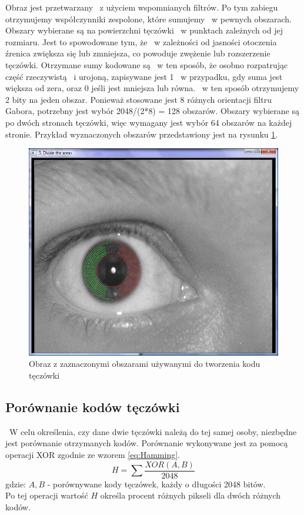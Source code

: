 Obraz jest przetwarzany ~z użyciem wspomnianych filtrów. Po tym zabiegu otrzymujemy współczynniki zespolone, które sumujemy ~w pewnych obszarach. Obszary wybierane są na powierzchni tęczówki ~w punktach zależnych od jej rozmiaru. Jest to spowodowane tym, że ~w zależności od jasności otoczenia źrenica zwiększa się lub zmniejsza, co powoduje zwężenie lub rozszerzenie tęczówki. Otrzymane sumy kodowane są ~w ten sposób, że osobno rozpatrując część rzeczywistą ~i urojoną, zapisywane jest 1 ~w przypadku, gdy suma jest większa od zera, oraz 0 jeśli jest mniejsza lub równa. ~w ten sposób otrzymujemy 2 bity na jeden obszar. Ponieważ stosowane jest 8 różnych orientacji filtru Gabora, potrzebny jest wybór 2048/(2*8) = 128 obszarów. Obszary wybierane są po dwóch stronach tęczówki, więc wymagany jest wybór 64 obszarów na każdej stronie. Przykład wyznaczonych obszarów przedstawiony jest na rysunku \ref{fig:obszaryNasze}.

\begin{figure}
\label{fig:obszaryNasze}
\begin{center}
\includegraphics[scale=0.5]{obszary.jpg}
\caption{Obraz z zaznaczonymi obszarami używanymi do tworzenia kodu tęczówki}
\end{center}
\end{figure}

\subsection{Porównanie kodów tęczówki}
\label{subsec:porownanieKodow}
~W celu określenia, czy dane dwie tęczówki należą do tej samej osoby, niezbędne jest porównanie otrzymanych kodów. Porównanie wykonywane jest za pomocą operacji XOR zgodnie ze wzorem \ref{eq:Hamming}.
\begin{equation}
\label{eq:Hamming}
H = \sum \frac{XOR(A,B)}{2048}
\end{equation}
gdzie:
$A, B$ - porównywane kody tęczówek, każdy o długości 2048 bitów.\\
Po tej operacji wartość $H$ określa procent różnych pikseli dla dwóch różnych kodów.

